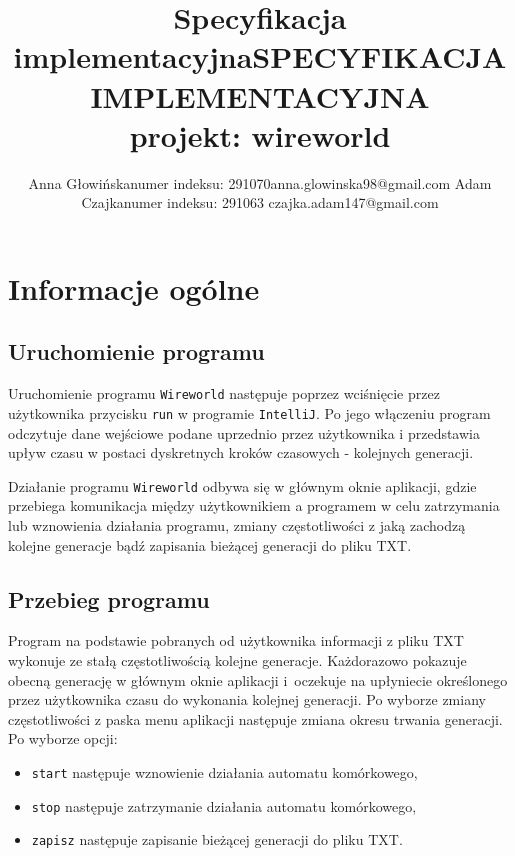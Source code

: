\documentclass[a4paper,12pt,oneside]{article}
\begin{document}
\makeatother

\title{Specyfikacja implementacyjna}

\title{SPECYFIKACJA IMPLEMENTACYJNA\\projekt: wireworld}

\author{Anna Głowińska\newline numer indeksu: 291070\newline anna.glowinska98@gmail.com \newline \newline
Adam Czajka\newline numer indeksu: 291063 \newline czajka.adam147@gmail.com}

\maketitle
\tableofcontents
\thispagestyle{fancy}
\newpage

\section{Informacje ogólne}

\subsection{Uruchomienie programu}
Uruchomienie programu \verb+Wireworld+ następuje poprzez wciśnięcie przez użytkownika przycisku \verb+run+ w programie \verb+IntelliJ+. Po jego włączeniu program odczytuje dane wejściowe podane uprzednio przez użytkownika i przedstawia upływ czasu w postaci dyskretnych kroków czasowych - kolejnych generacji.
\par Działanie programu \verb+Wireworld+ odbywa się w głównym oknie aplikacji, gdzie przebiega komunikacja między użytkownikiem a programem w celu zatrzymania lub wznowienia działania programu, zmiany częstotliwości z jaką zachodzą kolejne generacje bądź zapisania bieżącej generacji do pliku TXT.


\subsection{Przebieg programu}
Program na podstawie pobranych od użytkownika informacji z pliku TXT wykonuje ze stałą częstotliwością kolejne generacje. Każdorazowo pokazuje obecną generację w głównym oknie aplikacji i~oczekuje na upłyniecie określonego przez użytkownika czasu do wykonania kolejnej generacji. Po wyborze zmiany częstotliwości z paska menu aplikacji następuje zmiana okresu trwania generacji. Po wyborze opcji:
\begin{itemize}
\item \verb+start+ następuje wznowienie działania automatu komórkowego,
\item \verb+stop+ następuje zatrzymanie działania automatu komórkowego,
\item \verb+zapisz+ następuje zapisanie bieżącej generacji do pliku TXT.
\end{itemize}
\end{document}

